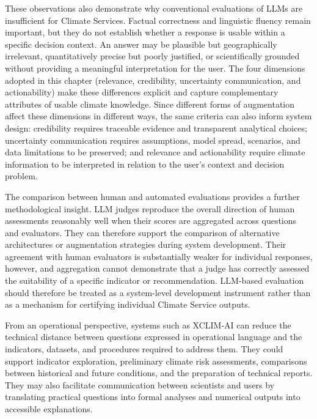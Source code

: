 These observations also demonstrate why conventional evaluations of LLMs are insufficient for Climate Services. Factual correctness and linguistic fluency remain important, but they do not establish whether a response is usable within a specific decision context. An answer may be plausible but geographically irrelevant, quantitatively precise but poorly justified, or scientifically grounded without providing a meaningful interpretation for the user. The four dimensions adopted in this chapter (relevance, credibility, uncertainty communication, and actionability) make these differences explicit and capture complementary attributes of usable climate knowledge. Since different forms of augmentation affect these dimensions in different ways, the same criteria can also inform system design: credibility requires traceable evidence and transparent analytical choices; uncertainty communication requires assumptions, model spread, scenarios, and data limitations to be preserved; and relevance and actionability require climate information to be interpreted in relation to the user's context and decision problem.

The comparison between human and automated evaluations provides a further methodological insight. LLM judges reproduce the overall direction of human assessments reasonably well when their scores are aggregated across questions and evaluators. They can therefore support the comparison of alternative architectures or augmentation strategies during system development. Their agreement with human evaluators is substantially weaker for individual responses, however, and aggregation cannot demonstrate that a judge has correctly assessed the suitability of a specific indicator or recommendation. LLM-based evaluation should therefore be treated as a system-level development instrument rather than as a mechanism for certifying individual Climate Service outputs.

From an operational perspective, systems such as XCLIM-AI can reduce the technical distance between questions expressed in operational language and the indicators, datasets, and procedures required to address them. They could support indicator exploration, preliminary climate risk assessments, comparisons between historical and future conditions, and the preparation of technical reports. They may also facilitate communication between scientists and users by translating practical questions into formal analyses and numerical outputs into accessible explanations.

